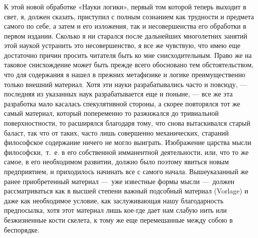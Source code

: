 \clearpage\setcounter{page}{1}\subsubsection[Предисловие ко второму
изданию]{}
\hypertarget{Toc478978578}{}К этой новой обработке «Науки логики», первый
том которой теперь выходит в свет, я, должен сказать, приступил с полным
сознанием как трудности и предмета самого по себе, а затем и его изложения,
так и несовершенства его обработки в первом издании. Сколько я ни старался
после дальнейших многолетних занятий этой наукой устранить это
несовершенство, я все же чувствую, что имею еще достаточно причин просить
читателя быть ко мне снисходительным. Право же на таковое снисхождение
может быть прежде всего обосновано тем обстоятельством, что для содержания
я нашел в прежних метафизике и логике преимущественно только внешний
материал. Хотя эти науки разрабатывались часто и повсюду, — последняя из
указанных наук разрабатывается еще и поныне, — все же эта разработка мало
касалась спекулятивной стороны, а скорее повторялся тот же самый материал,
который попеременно то разжижался до тривиальной поверхностности, то
расширялся благодаря тому, что снова вытаскивался старый баласт, так что от
таких, часто лишь совершенно механических, стараний философское содержание
ничего не могло выиграть. Изображение царства мысли философски,~т.~е. в его
собственной имманентной деятельности, или, что то же самое, в его
необходимом развитии, должно было поэтому явиться новым предприятием, и
приходилось начинать все с самого начала. Вышеуказанный же ранее
приобретенный материал —~уже известные формы мысли —~должен рассматриваться
как в высшей степени важный подсобный материал (Vorlage) и даже как
необходимое условие, как заслуживающая нашу благодарность предпосылка, хотя
этот материал лишь кое-где дает нам слабую нить или безжизненные кости
скелета, к тому же еще перемешанные между собою в беспорядке.

